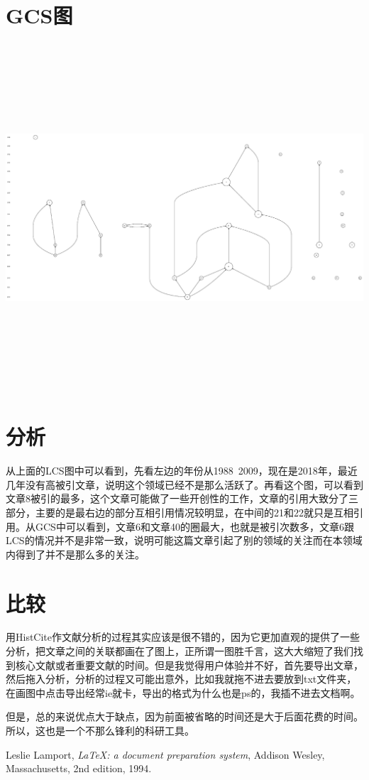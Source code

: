 \documentclass[UTF8]{ctexart}
\begin{document}
	\section{GCS图}
	\begin{center}
		\includegraphics[width=18cm,height=13cm]{GCS.eps}
	\end{center}
\section{分析}
从上面的LCS图中可以看到，先看左边的年份从1988~2009，现在是2018年，最近几年没有高被引文章，说明这个领域已经不是那么活跃了。再看这个图，可以看到文章8被引的最多，这个文章可能做了一些开创性的工作，文章的引用大致分了三部分，主要的是最右边的部分互相引用情况较明显，在中间的21和22就只是互相引用。从GCS中可以看到，文章6和文章40的圈最大，也就是被引次数多，文章6跟LCS的情况并不是非常一致，说明可能这篇文章引起了别的领域的关注而在本领域内得到了并不是那么多的关注。
\section{比较}
用HistCite作文献分析的过程其实应该是很不错的，因为它更加直观的提供了一些分析，把文章之间的关联都画在了图上，正所谓一图胜千言\smiley，这大大缩短了我们找到核心文献或者重要文献的时间。但是我觉得用户体验并不好，首先要导出文章，然后拖入分析，分析的过程又可能出意外，比如我就拖不进去要放到txt文件夹\frownie，在画图中点击导出经常ie就卡，导\cite{lamport94}出的格式为什么也是ps的，我插不进去文档啊。

但是，总的来说优点大于缺点，因为前面被省略的时间还是大于后面花费的时间。所以，这也是一个不那么锋利的科研工具。
\begin{thebibliography}{9}
	
	Leslie Lamport,
	\textit{\LaTeX: a document preparation system},
	Addison Wesley, Massachusetts,
	2nd edition,
	1994.
	
\end{thebibliography}
\end{document}
